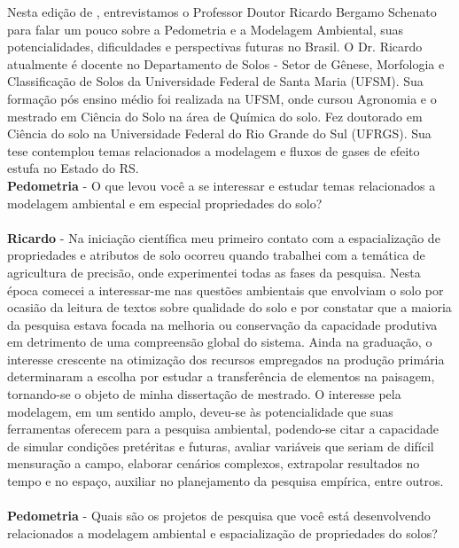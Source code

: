 Nesta edição de \pedometria, entrevistamos o Professor Doutor Ricardo Bergamo Schenato para falar um pouco sobre a Pedometria e a Modelagem Ambiental, suas potencialidades, dificuldades e perspectivas futuras no Brasil. O Dr. Ricardo atualmente é docente no Departamento de Solos - Setor de Gênese, Morfologia e Classificação de Solos da Universidade Federal de Santa Maria (UFSM). Sua formação pós ensino médio foi realizada na UFSM, onde cursou Agronomia e o mestrado em Ciência do Solo na área de Química do solo. Fez doutorado em Ciência do solo na Universidade Federal do Rio Grande do Sul (UFRGS). Sua tese contemplou temas relacionados a modelagem e fluxos de gases de efeito estufa no Estado do RS.
\\
\textbf{Pedometria} - O que levou você a se interessar e estudar temas relacionados a modelagem ambiental e em especial propriedades do solo?\\
\\
\textbf{Ricardo} - Na iniciação científica meu primeiro contato com a espacialização de propriedades e atributos de solo ocorreu quando trabalhei com a temática de agricultura de precisão, onde experimentei todas as fases da pesquisa. Nesta época comecei a interessar-me nas questões ambientais que envolviam o solo por ocasião da leitura de textos sobre qualidade do solo e por constatar que a maioria da pesquisa estava focada na melhoria ou conservação da capacidade produtiva em detrimento de uma compreensão global do sistema. Ainda na graduação, o interesse crescente na otimização dos recursos empregados na produção primária determinaram a escolha por estudar a transferência de elementos na paisagem, tornando-se o objeto de minha dissertação de mestrado. O interesse pela modelagem, em um sentido amplo, deveu-se às potencialidade que suas ferramentas oferecem para a pesquisa ambiental, podendo-se citar a capacidade de simular condições pretéritas e futuras, avaliar variáveis que seriam de difícil mensuração a campo, elaborar cenários complexos, extrapolar resultados no tempo e no espaço, auxiliar no planejamento da pesquisa empírica, entre outros.\\
\\
\textbf{Pedometria} - Quais são os projetos de pesquisa que você está desenvolvendo relacionados a modelagem ambiental e espacialização de propriedades do solos?\\
\\
